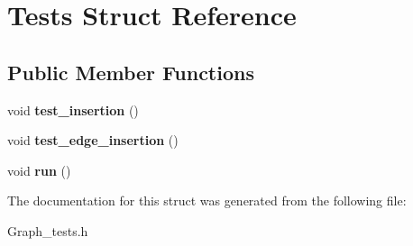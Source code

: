 \hypertarget{structTests}{\section{\-Tests \-Struct \-Reference}
\label{structTests}
}
\subsection*{\-Public \-Member \-Functions}
\begin{DoxyCompactItemize}
\item 
\hypertarget{structTests_aaace03165a065124d972825f837c7c53}{void {\bfseries test\-\_\-insertion} ()}\label{structTests_aaace03165a065124d972825f837c7c53}

\item 
\hypertarget{structTests_ad7d42578411d3fe6d1f2984987d406a7}{void {\bfseries test\-\_\-edge\-\_\-insertion} ()}\label{structTests_ad7d42578411d3fe6d1f2984987d406a7}

\item 
\hypertarget{structTests_adfb4ef5de0e1170bbc918be484ff673b}{void {\bfseries run} ()}\label{structTests_adfb4ef5de0e1170bbc918be484ff673b}

\end{DoxyCompactItemize}


\-The documentation for this struct was generated from the following file\-:\begin{DoxyCompactItemize}
\item 
\-Graph\-\_\-tests.\-h\end{DoxyCompactItemize}
